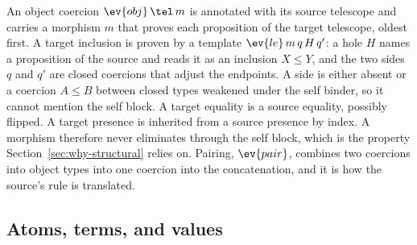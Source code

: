 An object coercion $\ev{obj}\,\tel\,m$ is annotated with its source telescope and carries a morphism $m$ that proves each proposition of the target telescope, oldest first. A target inclusion is proven by a template $\ev{le}\,m\,q\,H\,q'$: a hole $H$ names a proposition of the source and reads it as an inclusion $X \le Y$, and the two sides $q$ and $q'$ are closed coercions that adjust the endpoints. A side is either absent or a coercion $A \le B$ between closed types weakened under the self binder, so it cannot mention the self block. A target equality is a source equality, possibly flipped. A target presence is inherited from a source presence by index. A morphism therefore never eliminates through the self block, which is the property Section~\ref{sec:why-structural} relies on. Pairing, $\ev{pair}$, combines two coercions into object types into one coercion into the concatenation, and it is how the source's  rule is translated.

\subsection{Atoms, terms, and values}

